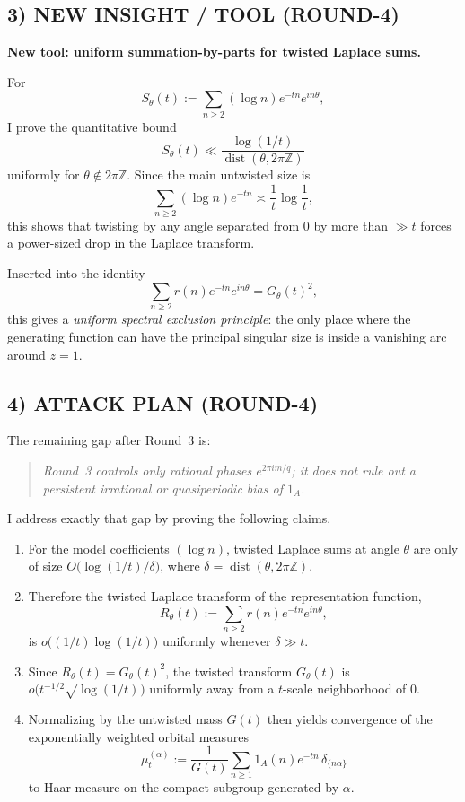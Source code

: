 \subsection*{3) NEW INSIGHT / TOOL (ROUND-4)}
\textbf{New tool: uniform summation-by-parts for twisted Laplace sums.}

For
\[
S_\theta(t):=\sum_{n\ge 2}(\log n)e^{-tn}e^{in\theta},
\]
I prove the quantitative bound
\[
S_\theta(t)\ll \frac{\log(1/t)}{\operatorname{dist}(\theta,2\pi\mathbb Z)}
\]
uniformly for $\theta\notin 2\pi\mathbb Z$.  Since the main untwisted size is
\[
\sum_{n\ge2}(\log n)e^{-tn}\asymp \frac1t\log\frac1t,
\]
this shows that twisting by any angle separated from $0$ by more than $\gg t$ forces a power-sized drop in the Laplace transform.

Inserted into the identity
\[
\sum_{n\ge2} r(n)e^{-tn}e^{in\theta}=G_\theta(t)^2,
\]
this gives a \emph{uniform spectral exclusion principle}: the only place where the generating function can have the principal singular size is inside a vanishing arc around $z=1$.

\subsection*{4) ATTACK PLAN (ROUND-4)}
The remaining gap after Round~3 is:
\begin{quote}
\emph{Round~3 controls only rational phases $e^{2\pi i m/q}$; it does not rule out a persistent irrational or quasiperiodic bias of $1_A$.}
\end{quote}

I address exactly that gap by proving the following claims.
\begin{enumerate}
\item For the model coefficients $(\log n)$, twisted Laplace sums at angle $\theta$ are only of size $O\big(\log(1/t)/\delta\big)$, where $\delta=\operatorname{dist}(\theta,2\pi\mathbb Z)$.
\item Therefore the twisted Laplace transform of the representation function,
\[
R_\theta(t):=\sum_{n\ge2}r(n)e^{-tn}e^{in\theta},
\]
is $o\big((1/t)\log(1/t)\big)$ uniformly whenever $\delta\gg t$.
\item Since $R_\theta(t)=G_\theta(t)^2$, the twisted transform $G_\theta(t)$ is $o\big(t^{-1/2}\sqrt{\log(1/t)}\big)$ uniformly away from a $t$-scale neighborhood of $0$.
\item Normalizing by the untwisted mass $G(t)$ then yields convergence of the exponentially weighted orbital measures
\[
\mu_t^{(\alpha)}:=\frac1{G(t)}\sum_{n\ge1}1_A(n)e^{-tn}\,\delta_{\{n\alpha\}}
\]
to Haar measure on the compact subgroup generated by $\alpha$.
\end{enumerate}

